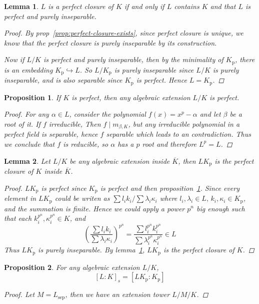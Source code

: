 \documentclass[a4paper]{article}
\newtheorem{lemma}{Lemma}
\theoremstyle{remark}
\theoremstyle{definition}
\theoremstyle{definition}
\theoremstyle{plain}
\newtheorem{proposition}{Proposition}
\begin{document}
  \begin{lemma} \label{lemma:perfect-closure-char}
    $L$ is a perfect closure of $K$ if and only if $L$ contains $K$ and that $L$ is perfect and
    purely inseparable.

    \begin{proof}
      By prop~\ref{prop:perfect-closure-exists}, since perfect closure is unique,
      we know that the perfect closure is purely inseparable by its construction.

      Now if $L/K$ is perfect and purely inseparable, then by the minimality of $K_\text{p}$,
      there is an embedding $K_\text{p} \hookrightarrow L$. So $L/K_\text{p}$ is purely inseparable
      since $L/K$ is purely inseparable, and is also separable since $K_\text{p}$ is perfect.
      Hence $L = K_\text{p}$.
    \end{proof}
  \end{lemma}

  \begin{proposition} \label{prop:alg-ext-of-perfect-is-perfect}
    If $K$ is perfect, then any algebraic extension $L/K$ is perfect.

    \begin{proof}
      For any $\alpha \in L$, consider the polynomial $f(x) = x^p - \alpha$ and let $\beta$ be a
      root of it. If $f$ irreducible, Then $f \mid m_{\beta, K}$, but any irreducible polynomial in a perfect field
      is separable, hence $f$ separable which leads to an contradiction. Thus we conclude that $f$ is
      reducible, so $\alpha$ has a $p$ root and therefore $L^p = L$.
    \end{proof}
  \end{proposition}

  \begin{lemma}
    Let $L/K$ be any algebraic extension inside $\overline{K}$, then $L K_\text{p}$ is
    the perfect closure of $K$ inside $\overline{K}$.

    \begin{proof}
      $L K_\text{p}$ is perfect since $K_\text{p}$ is perfect and then proposition~\ref{prop:alg-ext-of-perfect-is-perfect}.
      Since every element in $L K_\text{p}$ could be writen as $\sum l_i k_i / \sum \lambda_i \kappa_i$ where
      $l_i, \lambda_i \in L, \, k_i, \kappa_i \in K_\text{p}$, and the summation is finite.
      Hence we could apply a power $p^n$ big enough such that each $k_i^{p^n} , \kappa_i^{p^n} \in K$, and
      \[ \left( \frac{\sum l_i k_i}{\sum \lambda_i \kappa_i} \right)^{p^n} =
        \frac{\sum l_i^{p^n} k_i^{p^n}}{\sum \lambda_i^{p^n} \kappa_i^{p^n}} \in L \]
      Thus $L K_\text{p}$ is purely inseparable. By lemma~\ref{lemma:perfect-closure-char}, $L K_\text{p}$
      is the perfect closure of $K$.
    \end{proof}
  \end{lemma}

  \begin{proposition}
    For any algebraic extension $L/K$,
    \[ [L: K]_s = [LK_\mathrm{p}: K_\mathrm{p}] \]

    \begin{proof}
      Let $M = L_\mathrm{sep}$, then we have an extension tower $L/M/K$.
    \end{proof}
  \end{proposition}
\end{document}
